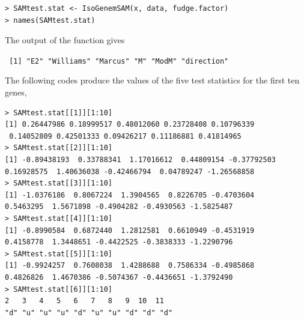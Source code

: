 \begin{center}
\begin{boxit}
\begin{verbatim}
> SAMtest.stat <- IsoGenemSAM(x, data, fudge.factor)
> names(SAMtest.stat)
\end{verbatim}
\end{boxit}
\end{center}
The output of the function gives
\begin{center}
\begin{boxit}
\texttt{
[1] "E2"        "Williams"  "Marcus"    "M"         "ModM"      "direction"
}
\end{boxit}
\end{center}

The following codes produce the values of the five test statistics for the first ten genes, 

\begin{center}
\begin{boxit}
{ \small
\begin{verbatim}
> SAMtest.stat[[1]][1:10]
[1] 0.26447986 0.18999517 0.48012060 0.23728408 0.10796339 
 0.14052809 0.42501333 0.09426217 0.11186881 0.41814965
> SAMtest.stat[[2]][1:10]
[1] -0.89438193  0.33788341  1.17016612  0.44809154 -0.37792503 
0.16928575  1.40636038 -0.42466794  0.04789247 -1.26568858
> SAMtest.stat[[3]][1:10]
[1] -1.0376186  0.8067224  1.3904565  0.8226705 -0.4703604  
0.5463295  1.5671898 -0.4904282 -0.4930563 -1.5825487
> SAMtest.stat[[4]][1:10]
[1] -0.8990584  0.6872440  1.2812581  0.6610949 -0.4531919  
0.4158778  1.3448651 -0.4422525 -0.3838333 -1.2290796 
> SAMtest.stat[[5]][1:10]
[1] -0.9924257  0.7608038  1.4288688  0.7586334 -0.4985868  
0.4826826  1.4670386 -0.5074367 -0.4436651 -1.3792490
> SAMtest.stat[[6]][1:10]
2   3   4   5   6   7   8   9  10  11
"d" "u" "u" "u" "d" "u" "u" "d" "d" "d"
\end{verbatim}
}
\end{boxit}
\end{center}


